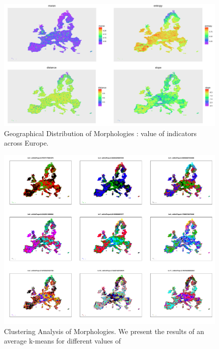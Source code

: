 \begin{figure}
\hspace{-5cm}
\includegraphics[angle=90,width=1.7\textwidth,height=\textheight]{Figures/PartII/Empirical/Static/Density/all_50km}
\caption[Geographical Distribution of Morphologies]{Geographical Distribution of Morphologies : value of indicators across Europe.}
\end{figure}


\begin{figure}
\hspace{-3cm}
\includegraphics[angle=90,width=1.7\textwidth,height=\textheight]{Figures/PartII/Empirical/Static/Density/clust_k3-11}
\caption[Clustering Analysis of Morphologies]{Clustering Analysis of Morphologies. We present the results of an average k-means for different values of }
\end{figure}






